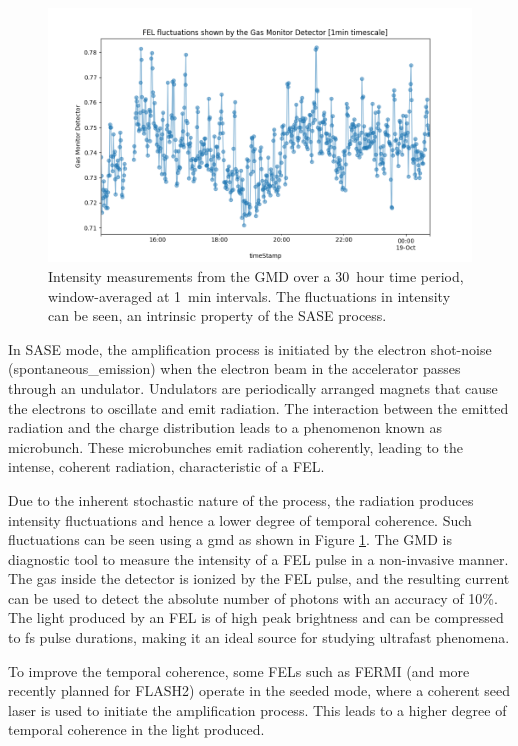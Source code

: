 \begin{figure}
    \centering
    \includegraphics[width=0.7\linewidth]{images/2024-08-16-13-56-32.png}
    \caption{Intensity measurements from the \gls{GMD} over a \qty{30}{hour} time period, window-averaged at \qty{1}{min} intervals. The fluctuations in intensity can be seen, an intrinsic property of the \gls{SASE} process.}
    \label{fig:gmd-intensity}
\end{figure}


In \gls{SASE} mode, the amplification process is initiated by the electron shot-noise (\gls{spontaneous_emission}) when the electron beam in the accelerator passes through an undulator. Undulators are periodically arranged magnets that cause the electrons to oscillate and emit radiation. The interaction between the emitted radiation and the charge distribution leads to a phenomenon known as \gls{microbunch}. These microbunches emit radiation coherently, leading to the intense, coherent radiation, characteristic of a \gls{FEL}. 

Due to the inherent stochastic nature of the process, the radiation produces intensity fluctuations and hence a lower degree of temporal coherence. Such fluctuations can be seen using a \gls{gmd} as shown in Figure \ref{fig:gmd-intensity}. The \gls{GMD} is diagnostic tool to measure the intensity of a \gls{FEL} pulse in a non-invasive manner. The gas inside the detector is ionized by the \gls{FEL} pulse, and the resulting current can be used to detect the absolute number of photons with an accuracy of 10\%. The light produced by an \gls{FEL} is of high peak brightness and can be compressed to \unit{fs} pulse durations, making it an ideal source for studying ultrafast phenomena.

To improve the temporal coherence, some \glspl{FEL} such as FERMI \cite{svandrlikDevelopmentPerspectivesFERMI2017} (and more recently planned for FLASH2) operate in the seeded mode, where a coherent seed laser is used to initiate the amplification process. This leads to a higher degree of temporal coherence in the light produced.

